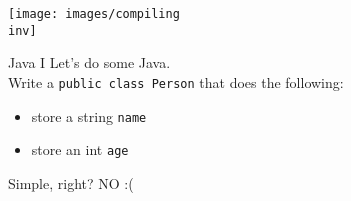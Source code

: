 \documentclass[10pt]{beamer}
\newcommand{\inv}{-inv}
\begin{document}
	\begin{frame}
		\begin{center}
			\texttt{[image: images/compiling\\inv]}
		\end{center}
	\end{frame}


	\begin{frame}[fragile]{Java I}
		Let's do some Java.\\
		Write a \texttt{public class Person} that does the following:
		\begin{itemize}
			\item store a string \texttt{name}
			\item store an int \texttt{age}
		\end{itemize}
		Simple, right?
		\vfill\pause
		NO :(
\end{frame}
	
	
\end{document}
